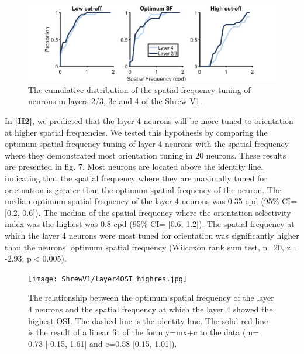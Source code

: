 		\begin{figure}[H]
	
	\includegraphics[width=\linewidth]{ShrewV1/sftuning_neurons_2.jpg}
	\caption{The cumulative distribution of the spatial frequency tuning of neurons in layers 2/3, 3c and 4 of the Shrew V1.}
	\label{fig:sftuning}
\end{figure}


In \textbf{[H2]}, we predicted that the layer 4 neurons will be more
tuned to orientation at higher spatial frequencies. We tested this
hypothesis by comparing the optimum spatial frequency tuning of layer 4
neurons with the spatial frequency where they demonstrated most
orientation tuning in 20 neurons. These results are presented in fig. 7.
Most neurons are located above the identity line, indicating that the
spatial frequency where they are maximally tuned for orietnation is
greater than the optimum spatial frequency of the neuron. The median
optimum spatial frequency of the layer 4 neurons was 0.35 cpd (95\% CI=
{[}0.2, 0.6{]}). The median of the spatial frequency where the
orientation selectivity index was the highest was 0.8 cpd (95\% CI=
{[}0.6, 1.2{]}). The spatial frequency at which the layer 4 neurons were
most tuned for orientation was significantly higher than the neurons'
optimum spatial frequency (Wilcoxon rank sum test, n=20, z= -2.93,
p\(<\)0.005).

\begin{figure}[H]
	
	\texttt{[image: ShrewV1/layer4OSI\_highres.jpg]}
	\caption{The relationship between the optimum spatial frequency of the layer 4 neurons and the spatial frequency at which the layer 4 showed the highest OSI. The dashed line is the identity line. The solid red line is the result of a linear fit of the form y=mx+c to the data (m= 0.73 [-0.15, 1.61] and c=0.58 [0.15, 1.01]). }
	\label{fig:OSI4}
\end{figure}


